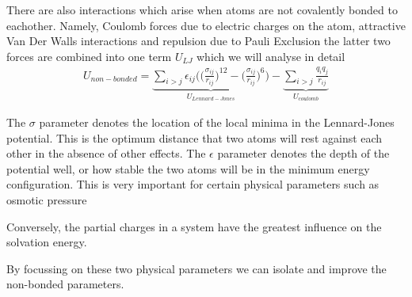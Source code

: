There are also interactions which arise when atoms are not covalently bonded to eachother. Namely, Coulomb forces due to electric charges on the atom, attractive Van Der Walls interactions and repulsion due to Pauli Exclusion the latter two forces are combined into one term $U_{LJ}$ which we will analyse in detail 
\begin{equation}\label{nonbonded_eqs}
	\begin{aligned}
		U_{non-bonded} = \underbrace{\sum_{i>j} \epsilon_{ij} \Big( \Big(\frac{\sigma_{ij}}{r_{ij}}\Big)^{12} - \Big(\frac{\sigma_{ij}}{r_{ij}}\Big)^{6} \Big)}_{U_{Lennard-Jones}} - \underbrace{\sum_{i>j} \frac{q_i q_j } {r_{ij}}}_{U_{coulomb}}
	\end{aligned}
\end{equation}


The $\sigma$ parameter denotes the location of the local minima in the Lennard-Jones potential. This is the optimum distance that two atoms will rest against each other in the absence of other effects. The $\epsilon$ parameter denotes the depth of the potential well, or how stable the two atoms will be in the minimum energy configuration. This is very important for certain physical parameters such as osmotic pressure  \cite{yoo2018a}

Conversely, the partial charges in a system have the greatest influence on the solvation energy.

By focussing on these two physical parameters we can isolate and improve the non-bonded parameters.

